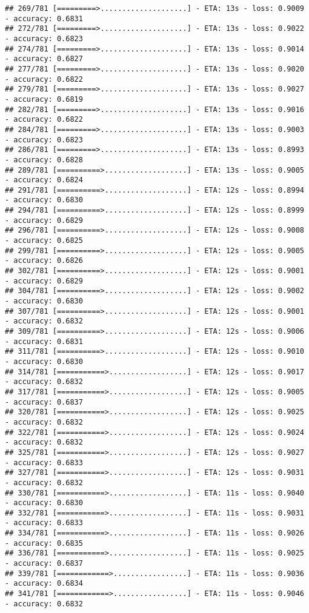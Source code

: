 \documentclass[
]{article}
\begin{document}
\begin{verbatim}
## 269/781 [=========>....................] - ETA: 13s - loss: 0.9009 - accuracy: 0.6831
## 272/781 [=========>....................] - ETA: 13s - loss: 0.9022 - accuracy: 0.6823
## 274/781 [=========>....................] - ETA: 13s - loss: 0.9014 - accuracy: 0.6827
## 277/781 [=========>....................] - ETA: 13s - loss: 0.9020 - accuracy: 0.6822
## 279/781 [=========>....................] - ETA: 13s - loss: 0.9027 - accuracy: 0.6819
## 282/781 [=========>....................] - ETA: 13s - loss: 0.9016 - accuracy: 0.6822
## 284/781 [=========>....................] - ETA: 13s - loss: 0.9003 - accuracy: 0.6823
## 286/781 [=========>....................] - ETA: 13s - loss: 0.8993 - accuracy: 0.6828
## 289/781 [==========>...................] - ETA: 13s - loss: 0.9005 - accuracy: 0.6824
## 291/781 [==========>...................] - ETA: 12s - loss: 0.8994 - accuracy: 0.6830
## 294/781 [==========>...................] - ETA: 12s - loss: 0.8999 - accuracy: 0.6829
## 296/781 [==========>...................] - ETA: 12s - loss: 0.9008 - accuracy: 0.6825
## 299/781 [==========>...................] - ETA: 12s - loss: 0.9005 - accuracy: 0.6826
## 302/781 [==========>...................] - ETA: 12s - loss: 0.9001 - accuracy: 0.6829
## 304/781 [==========>...................] - ETA: 12s - loss: 0.9002 - accuracy: 0.6830
## 307/781 [==========>...................] - ETA: 12s - loss: 0.9001 - accuracy: 0.6832
## 309/781 [==========>...................] - ETA: 12s - loss: 0.9006 - accuracy: 0.6831
## 311/781 [==========>...................] - ETA: 12s - loss: 0.9010 - accuracy: 0.6830
## 314/781 [===========>..................] - ETA: 12s - loss: 0.9017 - accuracy: 0.6832
## 317/781 [===========>..................] - ETA: 12s - loss: 0.9005 - accuracy: 0.6837
## 320/781 [===========>..................] - ETA: 12s - loss: 0.9025 - accuracy: 0.6832
## 322/781 [===========>..................] - ETA: 12s - loss: 0.9024 - accuracy: 0.6832
## 325/781 [===========>..................] - ETA: 12s - loss: 0.9027 - accuracy: 0.6833
## 327/781 [===========>..................] - ETA: 12s - loss: 0.9031 - accuracy: 0.6832
## 330/781 [===========>..................] - ETA: 11s - loss: 0.9040 - accuracy: 0.6830
## 332/781 [===========>..................] - ETA: 11s - loss: 0.9031 - accuracy: 0.6833
## 334/781 [===========>..................] - ETA: 11s - loss: 0.9026 - accuracy: 0.6835
## 336/781 [===========>..................] - ETA: 11s - loss: 0.9025 - accuracy: 0.6837
## 339/781 [============>.................] - ETA: 11s - loss: 0.9036 - accuracy: 0.6834
## 341/781 [============>.................] - ETA: 11s - loss: 0.9046 - accuracy: 0.6832

\end{verbatim}
\end{document}
